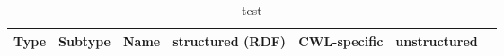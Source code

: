 \begin{table*}[ht!]
\caption{test}
\label{tab:analysis_res}

\begin{tabularx}{\linewidth}{l l L l l l l}
\toprule
{Type} & {Subtype} & {Name} & {\textbf{structured (RDF)}} & {CWL-specific} & {unstructured}  \\
\midrule

\end{tabularx}
\end{table*}
